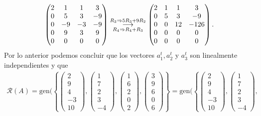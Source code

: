 \documentclass[11pt,letterpaper]{article}
\newcommand{\mcR}{\mathcal{R}}
\newcommand{\grstep}[2][\relax]{%
   \ensuremath{\mathrel{
       {\mathop{\longrightarrow}\limits^{#2\mathstrut}_{
                                     \begin{subarray}{l} #1 \end{subarray}}}}}}
\newcommand{\gen}{\text{gen}}
\begin{document}
\begin{enumerate}
\begin{align*}
\begin{pmatrix}
 2&1 &1&3\\
 0&5 &3&-9\\
 0&-9&-3&-9\\
 0&9 &3&9\\
 0&0 &0&0
\end{pmatrix}%
\grstep[R_4\Rightarrow R_4+R_3]{R_3 \Rightarrow 5R_3+9R_2}
%
\begin{pmatrix}
 2&1 &1&3\\
 0&5 &3&-9\\
 0&0&12&-126\\
 0&0 &0&0\\
 0&0 &0&0
\end{pmatrix}.
\end{align*}
Por lo anterior podemos concluir que los vectores $a_1^t, a_2^t$ y $a_3^t$ son linealmente independientes y que 
\begin{align*}
\mcR(A)=\gen(\left\{\begin{pmatrix}2\\9\\4\\-3\\10\end{pmatrix}, 
\begin{pmatrix}1\\7\\2\\3\\-4\end{pmatrix},
\begin{pmatrix}1\\6\\2\\0\\2\end{pmatrix},
\begin{pmatrix}3\\9\\6\\0\\6\end{pmatrix}
\right\}=\gen(\left\{\begin{pmatrix}2\\9\\4\\-3\\10\end{pmatrix}, 
\begin{pmatrix}1\\7\\2\\3\\-4\end{pmatrix},

\end{align*}
\end{enumerate}
\end{document}
